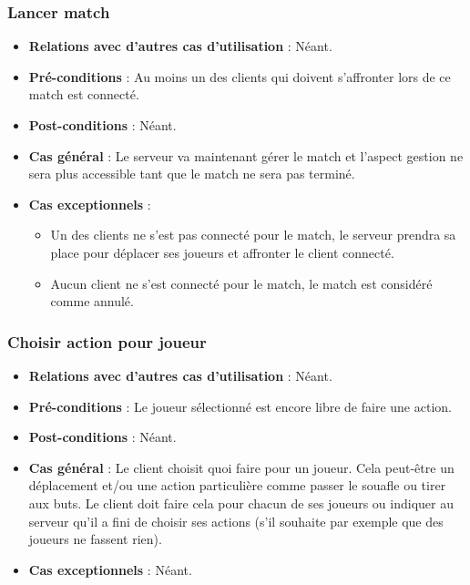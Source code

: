 \documentclass[a4paper,titlepage]{scrreprt}
\begin{document}
    \subsubsection{Lancer match}
      \begin{itemize}
        \item \textbf{Relations avec d'autres cas d'utilisation}  : Néant.
        \item \textbf{Pré-conditions} : Au moins un des clients qui doivent s’affronter lors de ce match est connecté.
        \item \textbf{Post-conditions} : Néant.
        \item \textbf{Cas général} : Le serveur va maintenant gérer le match et l’aspect gestion ne sera plus accessible tant que le match ne sera pas terminé.
        \item \textbf{Cas exceptionnels} : 
          \begin{itemize}
            \item Un des clients ne s’est pas connecté pour le match, le serveur prendra sa place pour déplacer ses joueurs et affronter le client connecté.
			\item Aucun client ne s’est connecté pour le match, le match est considéré comme annulé.
          \end{itemize}    	
      \end{itemize}
    \subsubsection{Choisir action pour joueur}
      \begin{itemize}
        \item \textbf{Relations avec d'autres cas d'utilisation}  : Néant.
        \item \textbf{Pré-conditions} : Le joueur sélectionné est encore libre de faire une action.
        \item \textbf{Post-conditions} : Néant.
        \item \textbf{Cas général} : Le client choisit quoi faire pour un joueur. Cela peut-être un déplacement et/ou une action particulière comme passer le souafle ou tirer aux buts. Le client doit faire cela pour chacun de ses joueurs ou indiquer au serveur qu’il a fini de choisir ses actions (s’il souhaite par exemple que des joueurs ne fassent rien).
        \item \textbf{Cas exceptionnels} : Néant.
      \end{itemize}
\end{document}
